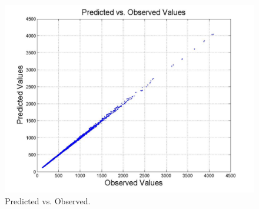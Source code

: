 %
%
\begin{figure}[ht] %
    \centering
        \includegraphics[width=0.65\linewidth, bb=0 0 1164 948]{figRunBigPredictedvsObserved3.jpg}
      \caption{Predicted vs. Observed.}
      \label{Fig:EstimatedvsSimulated}
\end{figure}

